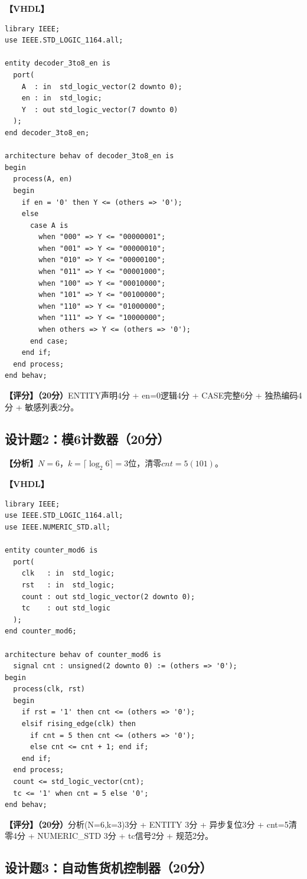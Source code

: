 \textbf{【VHDL】}
\begin{lstlisting}
library IEEE;
use IEEE.STD_LOGIC_1164.all;

entity decoder_3to8_en is
  port(
    A  : in  std_logic_vector(2 downto 0);
    en : in  std_logic;
    Y  : out std_logic_vector(7 downto 0)
  );
end decoder_3to8_en;

architecture behav of decoder_3to8_en is
begin
  process(A, en)
  begin
    if en = '0' then Y <= (others => '0');
    else
      case A is
        when "000" => Y <= "00000001";
        when "001" => Y <= "00000010";
        when "010" => Y <= "00000100";
        when "011" => Y <= "00001000";
        when "100" => Y <= "00010000";
        when "101" => Y <= "00100000";
        when "110" => Y <= "01000000";
        when "111" => Y <= "10000000";
        when others => Y <= (others => '0');
      end case;
    end if;
  end process;
end behav;
\end{lstlisting}

\textbf{【评分】（20分）}ENTITY声明4分 + en=0逻辑4分 + CASE完整6分 + 独热编码4分 + 敏感列表2分。

\subsection{设计题2：模6计数器（20分）}

\textbf{【分析】}$N=6$，$k=\lceil\log_2 6\rceil=3$位，清零$cnt=5(101)$。

\textbf{【VHDL】}
\begin{lstlisting}
library IEEE;
use IEEE.STD_LOGIC_1164.all;
use IEEE.NUMERIC_STD.all;

entity counter_mod6 is
  port(
    clk   : in  std_logic;
    rst   : in  std_logic;
    count : out std_logic_vector(2 downto 0);
    tc    : out std_logic
  );
end counter_mod6;

architecture behav of counter_mod6 is
  signal cnt : unsigned(2 downto 0) := (others => '0');
begin
  process(clk, rst)
  begin
    if rst = '1' then cnt <= (others => '0');
    elsif rising_edge(clk) then
      if cnt = 5 then cnt <= (others => '0');
      else cnt <= cnt + 1; end if;
    end if;
  end process;
  count <= std_logic_vector(cnt);
  tc <= '1' when cnt = 5 else '0';
end behav;
\end{lstlisting}

\textbf{【评分】（20分）}分析(N=6,k=3)3分 + ENTITY 3分 + 异步复位3分 + cnt=5清零4分 + NUMERIC\_STD 3分 + tc信号2分 + 规范2分。

\subsection{设计题3：自动售货机控制器（20分）}

